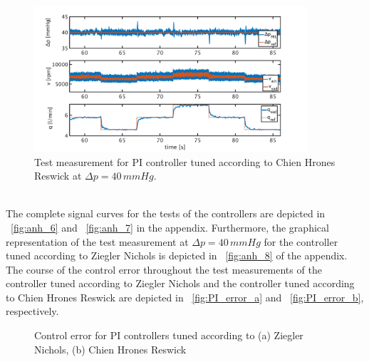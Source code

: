\begin{figure}[ht]
  \centering
  \includegraphics[width=0.9\textwidth]{images/chapt_5/pi_contr_chr_40.pdf}
  \caption[Test measurement for PI controller tuned according to Chien Hrones Reswick at $\Delta{p}=40\,mmHg$]{Test measurement for PI controller tuned according to Chien Hrones Reswick at $\Delta{p}=40\,mmHg$.}
  \label{fig:pi_contr_chr_40}
\end{figure}
\\The complete signal curves for the tests of the controllers are depicted in \figurename~\ref{fig:anh_6} and \figurename~\ref{fig:anh_7} in the appendix. Furthermore, the graphical representation of the test measurement at $\Delta{p}=40\,mmHg$ for the controller tuned according to Ziegler Nichols is depicted in \figurename~\ref{fig:anh_8} of the appendix.
\\The course of the control error throughout the test measurements of the controller tuned according to Ziegler Nichols and the controller tuned according to Chien Hrones Reswick are depicted in \figurename~\ref{fig:PI_error_a} and \figurename~\ref{fig:PI_error_b}, respectively.
\begin{figure}[ht]
  \centering
  \caption[Control error for PI Controllers]{Control error for PI controllers tuned according to (a) Ziegler Nichols, (b) Chien Hrones Reswick}
  \label{fig:PI_error}
\end{figure}
